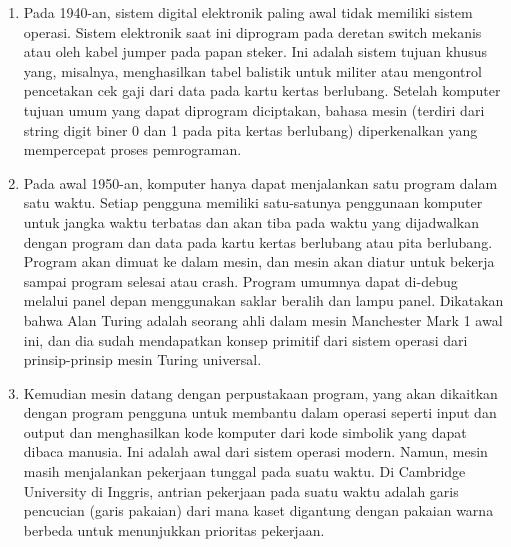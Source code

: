 \begin{enumerate}
		\item Pada 1940-an, sistem digital elektronik paling awal tidak memiliki sistem operasi. Sistem elektronik saat ini diprogram pada deretan switch mekanis atau oleh kabel jumper pada papan steker. Ini adalah sistem tujuan khusus yang, misalnya, menghasilkan tabel balistik untuk militer atau mengontrol pencetakan cek gaji dari data pada kartu kertas berlubang. Setelah komputer tujuan umum yang dapat diprogram diciptakan, bahasa mesin (terdiri dari string digit biner 0 dan 1 pada pita kertas berlubang) diperkenalkan yang mempercepat proses pemrograman.
		\item Pada awal 1950-an, komputer hanya dapat menjalankan satu program dalam satu waktu. Setiap pengguna memiliki satu-satunya penggunaan komputer untuk jangka waktu terbatas dan akan tiba pada waktu yang dijadwalkan dengan program dan data pada kartu kertas berlubang atau pita berlubang. Program akan dimuat ke dalam mesin, dan mesin akan diatur untuk bekerja sampai program selesai atau crash. Program umumnya dapat di-debug melalui panel depan menggunakan saklar beralih dan lampu panel. Dikatakan bahwa Alan Turing adalah seorang ahli dalam mesin Manchester Mark 1 awal ini, dan dia sudah mendapatkan konsep primitif dari sistem operasi dari prinsip-prinsip mesin Turing universal.
		\item Kemudian mesin datang dengan perpustakaan program, yang akan dikaitkan dengan program pengguna untuk membantu dalam operasi seperti input dan output dan menghasilkan kode komputer dari kode simbolik yang dapat dibaca manusia. Ini adalah awal dari sistem operasi modern. Namun, mesin masih menjalankan pekerjaan tunggal pada suatu waktu. Di Cambridge University di Inggris, antrian pekerjaan pada suatu waktu adalah garis pencucian (garis pakaian) dari mana kaset digantung dengan pakaian warna berbeda untuk menunjukkan prioritas pekerjaan. 

	\end{enumerate}
